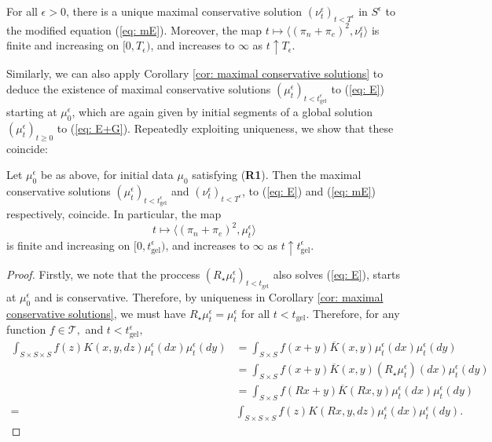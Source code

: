 \begin{lemma}\label{lemma: solution to modified equation}
    For all $\epsilon>0$, there is a unique maximal conservative solution  $(\nu^\epsilon_t)_{t< T^\epsilon}$ in $S^\epsilon$ to the modified equation (\ref{eq: mE}). Moreover, the map $t\mapsto \langle (\pi_n+\pi_e)^2, \nu^\epsilon_t\rangle$ is finite and increasing on $[0,T_\epsilon)$, and increases to $\infty$ as $t\uparrow T_\epsilon$. 
\end{lemma} Similarly, we can also apply Corollary \ref{cor: maximal conservative solutions} to deduce the existence of maximal conservative solutions $(\mu^\epsilon_t)_{t<t_\text{gel}^\epsilon}$ to (\ref{eq: E}) starting at $\mu^\epsilon_0$, which are again given by initial segments of a global solution $(\mu^\epsilon_t)_{t\geq 0}$ to (\ref{eq: E+G}). Repeatedly exploiting uniqueness, we show that these coincide: \begin{lemma} Let $\mu^\epsilon_0$ be as above, for initial data $\mu_0$ satisfying (\textbf{R1}). Then the maximal conservative solutions $(\mu^\epsilon_t)_{t<t_\text{gel}^\epsilon}$ and $(\nu^\epsilon_t)_{t<T^\epsilon}$, to (\ref{eq: E}) and (\ref{eq: mE}) respectively, coincide. In particular, the map \begin{equation*}
    t\mapsto \langle (\pi_n+\pi_e)^2, \mu^\epsilon_t\rangle
\end{equation*} is finite and increasing on $[0, t_\text{gel}^\epsilon)$, and increases to $\infty$ as $t\uparrow t_\text{gel}^\epsilon.$ \end{lemma}\begin{proof} Firstly, we note that the proccess $(R_\star \mu^\epsilon_t)_{t<t_\text{gel}}$ also solves (\ref{eq: E}), starts at $\mu^\epsilon_0$ and is conservative. Therefore, by uniqueness in Corollary \ref{cor: maximal conservative solutions}, we must have $R_\star \mu^\epsilon_t=\mu^\epsilon_t$ for all $t<t_\text{gel}.$ Therefore, for any function $f\in \mathcal{T},$ and $t<t^\epsilon_\text{gel},$ \begin{equation} \begin{split}
        \int_{S\times S\times S} f(z)K(x,y,dz)\mu^\epsilon_t(dx)\mu^\epsilon_t(dy)& = \int_{S\times S} f(x+y)\overline{K}(x,y)\mu^\epsilon_t(dx)\mu^\epsilon_t(dy) \\ &=\int_{S\times S} f(x+y)\overline{K}(x,y)(R_\star\mu^\epsilon_t)(dx)\mu^\epsilon_t(dy) \\& = \int_{S\times S} f(Rx+y)\overline{K}(Rx,y)\mu^\epsilon_t(dx)\mu^\epsilon_t(dy)\\ = &\int_{S\times S\times S} f(z)K(Rx,y,dz)\mu^\epsilon_t(dx)\mu^\epsilon_t(dy).

\end{split}
\end{equation}
\end{proof}
